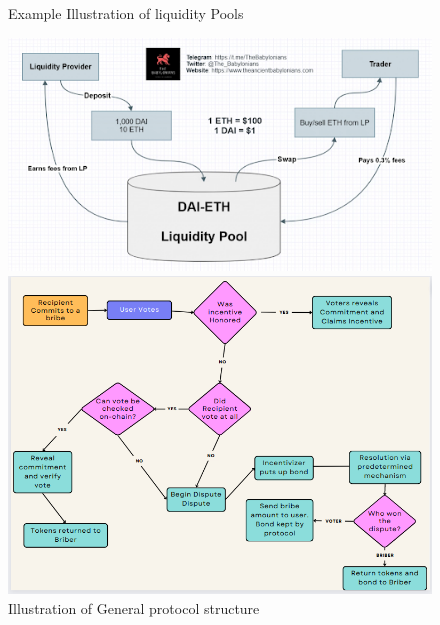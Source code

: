 \documentclass{article}
\begin{document}
\begin{figure}[p]
\centering

\caption{Example Illustration of liquidity Pools }
\includegraphics[scale=.75]{../misc/liquidityPool.png}

\caption{Illustration of General protocol structure}
\includegraphics[scale=0.47]{../misc/protocol_structure.png}
\end{figure}
\end{document}
